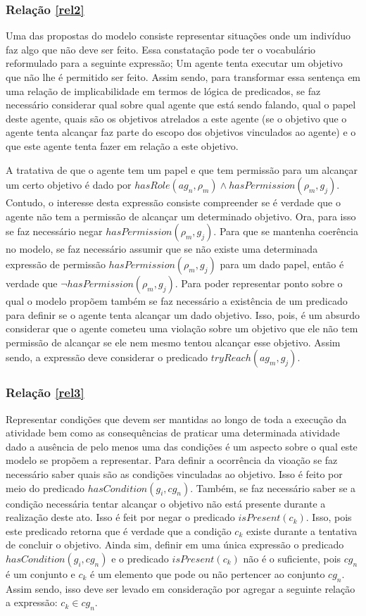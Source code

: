 \documentclass[12pt]{article}
\begin{document}
\subsubsection{Relação \ref{rel2}}
Uma das propostas do modelo consiste representar situações onde um indivíduo faz algo que não deve ser feito. Essa constatação pode ter o vocabulário reformulado para a seguinte expressão; Um agente tenta executar um objetivo que não lhe é permitido ser feito. Assim sendo, para transformar essa sentença em uma relação de implicabilidade em termos de lógica de predicados, se faz necessário considerar qual sobre qual agente que está sendo falando, qual o papel deste agente, quais são os objetivos atrelados a este agente (se o objetivo que o agente tenta alcançar faz parte do escopo dos objetivos vinculados ao agente) e o que este agente tenta fazer em relação a este objetivo. 

A tratativa de que o agente tem um papel e que tem permissão para um alcançar um certo objetivo é dado por $hasRole(ag_n,\rho_m) \wedge hasPermission(\rho_m,g_j)$. Contudo, o interesse desta expressão consiste compreender se é verdade que o agente não tem a permissão de alcançar um determinado objetivo. Ora, para isso se faz necessário negar $hasPermission(\rho_m,g_j)$. Para que se mantenha coerência no modelo, se faz necessário assumir que se não existe uma determinada expressão de permissão $hasPermission(\rho_m,g_j)$ para um dado papel, então é verdade que $\neg hasPermission(\rho_m,g_j)$. Para poder representar ponto sobre o qual o modelo propõem também se faz necessário a existência de um predicado para definir se o agente tenta alcançar um dado objetivo. Isso, pois, é um absurdo considerar que o agente cometeu uma violação sobre um objetivo que ele não tem permissão de alcançar se ele nem mesmo tentou alcançar esse objetivo. Assim sendo, a expressão deve considerar o predicado $tryReach(ag_m,g_j)$. 

\subsubsection{Relação \ref{rel3}}
Representar condições que devem ser mantidas ao longo de toda a execução da atividade bem como as consequências de praticar uma determinada atividade dado a ausência de pelo menos uma das condições é um aspecto sobre o qual este modelo se propõem a representar. Para definir a ocorrência da vioação se faz necessário saber quais são as condições vinculadas ao objetivo. Isso é feito por meio do predicado $hasCondition(g_i,cg_n)$. Também, se faz necessário saber se a condição necessária tentar alcançar o objetivo não está presente durante a realização deste ato. Isso é feit por negar o predicado $isPresent(c_k)$. Isso, pois este predicado retorna que é verdade que a condição $c_k$ existe durante a tentativa de concluir o objetivo. Ainda sim, definir em uma única expressão o predicado $hasCondition(g_i,cg_n)$ e o predicado $isPresent(c_k)$ não é o suficiente, pois $cg_n$ é um conjunto e $c_k$ é um elemento que pode ou não pertencer ao conjunto $cg_n$. Assim sendo, isso deve ser levado em consideração por agregar a seguinte relação a expressão: $c_k \in cg_n$. 
\end{document}
